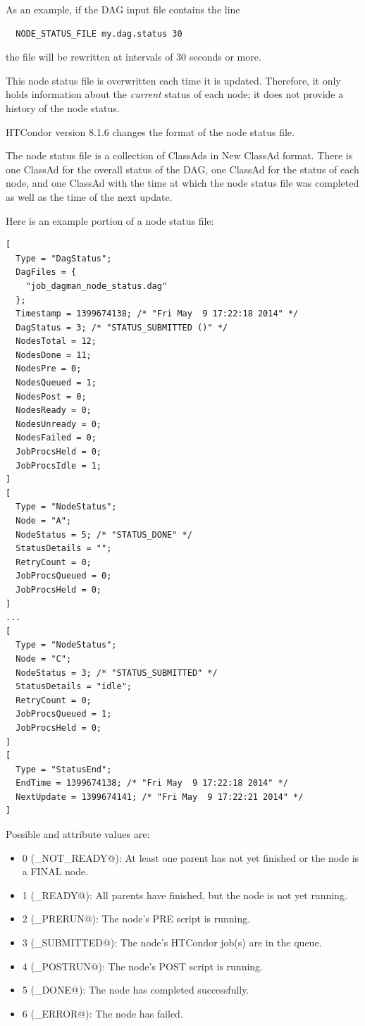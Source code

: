 As an example, if the DAG input file contains the line
\begin{verbatim}
  NODE_STATUS_FILE my.dag.status 30
\end{verbatim}
the file  will be rewritten at intervals of 30 seconds
or more.

This node status file is overwritten each time it is updated.
Therefore, it only holds information about the \emph{current} status 
of each node; it does not provide a history of the node status.

\Note HTCondor version 8.1.6 changes the format of the node status
file.

The node status file is a collection of ClassAds in New ClassAd format.
There is one ClassAd for the overall status of the DAG, one ClassAd
for the status of each node, and one ClassAd with the time at which
the node status file was completed as well as the time of the next update.

Here is an example portion of a node status file:

\begin{verbatim}
[
  Type = "DagStatus";
  DagFiles = {
    "job_dagman_node_status.dag"
  };
  Timestamp = 1399674138; /* "Fri May  9 17:22:18 2014" */
  DagStatus = 3; /* "STATUS_SUBMITTED ()" */
  NodesTotal = 12;
  NodesDone = 11;
  NodesPre = 0;
  NodesQueued = 1;
  NodesPost = 0;
  NodesReady = 0;
  NodesUnready = 0;
  NodesFailed = 0;
  JobProcsHeld = 0;
  JobProcsIdle = 1;
]
[
  Type = "NodeStatus";
  Node = "A";
  NodeStatus = 5; /* "STATUS_DONE" */
  StatusDetails = "";
  RetryCount = 0;
  JobProcsQueued = 0;
  JobProcsHeld = 0;
]
...
[
  Type = "NodeStatus";
  Node = "C";
  NodeStatus = 3; /* "STATUS_SUBMITTED" */
  StatusDetails = "idle";
  RetryCount = 0;
  JobProcsQueued = 1;
  JobProcsHeld = 0;
]
[
  Type = "StatusEnd";
  EndTime = 1399674138; /* "Fri May  9 17:22:18 2014" */
  NextUpdate = 1399674141; /* "Fri May  9 17:22:21 2014" */
]
\end{verbatim}

Possible  and  attribute values are:

\begin{itemize}
\item 0 (\verb@STATUS_NOT_READY@): At least one parent has not yet finished
or the node is a FINAL node.
\item 1 (\verb@STATUS_READY@): All parents have finished, but the node is not
yet running.
\item 2 (\verb@STATUS_PRERUN@): The node's PRE script is running.
\item 3 (\verb@STATUS_SUBMITTED@): The node's HTCondor job(s) are in 
  the queue.
\item 4 (\verb@STATUS_POSTRUN@): The node's POST script is running.
\item 5 (\verb@STATUS_DONE@): The node has completed successfully.
\item 6 (\verb@STATUS_ERROR@): The node has failed.
\end{itemize}

